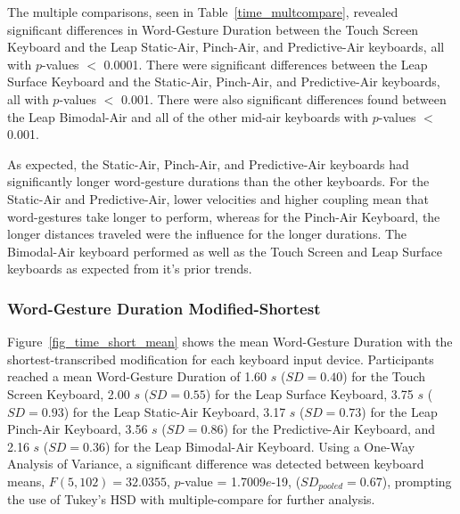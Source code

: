 The multiple comparisons, seen in Table~\ref{time_multcompare}, revealed significant differences in Word-Gesture Duration between the Touch Screen Keyboard and the Leap Static-Air, Pinch-Air, and Predictive-Air keyboards, all with $p$-values $<$ 0.0001. There were significant differences between the Leap Surface Keyboard and the Static-Air, Pinch-Air, and Predictive-Air keyboards, all with $p$-values $<$ 0.001. There were also significant differences found between the Leap Bimodal-Air and all of the other mid-air keyboards with $p$-values $<$ 0.001.

As expected, the Static-Air, Pinch-Air, and Predictive-Air keyboards had significantly longer word-gesture durations than the other keyboards. For the Static-Air and Predictive-Air, lower velocities and higher coupling mean that word-gestures take longer to perform, whereas for the Pinch-Air Keyboard, the longer distances traveled were the influence for the longer durations. The Bimodal-Air keyboard performed as well as the Touch Screen and Leap Surface keyboards as expected from it's prior trends. 

\subsubsection{Word-Gesture Duration Modified-Shortest}
Figure~\ref{fig_time_short_mean} shows the mean Word-Gesture Duration with the shortest-transcribed modification for each keyboard input device. Participants reached a mean Word-Gesture Duration of 1.60 $s$ ($SD = 0.40$) for the Touch Screen Keyboard, 2.00 $s$ ($SD = 0.55$) for the Leap Surface Keyboard, 3.75 $s$ ($SD = 0.93$) for the Leap Static-Air Keyboard, 3.17 $s$ ($SD = 0.73$) for the Leap Pinch-Air Keyboard, 3.56 $s$ ($SD = 0.86$) for the Predictive-Air Keyboard, and 2.16 $s$ ($SD = 0.36$) for the Leap Bimodal-Air Keyboard. Using a One-Way Analysis of Variance, a significant difference was detected between keyboard means, $F(5, 102) = 32.0355$, $p$-value = 1.7009$e$-19, ($SD_{pooled} = 0.67$), prompting the use of Tukey's HSD with multiple-compare for further analysis.

